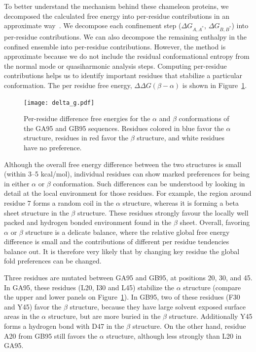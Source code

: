 \documentclass[12pt]{article}
\begin{document}
To better understand the mechanism behind these chameleon proteins, we decomposed the calculated free energy into
per-residue contributions in an approximate way~\cite{Tyka2006}. We decompose each confinement step ($\Delta
G_{A,A^\ast}$, $\Delta G_{B,B^\ast}$) into per-residue contributions. We can also decompose the remaining enthalpy in
the confined ensemble into per-residue contributions. However, the method is approximate because we do not include the
residual conformational entropy from the normal mode or quasiharmonic analysis steps. Computing per-residue
contributions helps us to identify important residues that stabilize a particular conformation. The per residue free
energy, $\Delta \Delta G (\beta - \alpha)$ is shown in Figure~\ref{fig:perresidue_orban}.

\begin{figure}
    \begin{center}
        \texttt{[image: delta\_g.pdf]}
    \end{center}
    \caption{Per-residue difference free energies for the $\alpha$ and $\beta$ conformations of the GA95 and GB95
        sequences. Residues colored in blue favor the $\alpha$ structure, residues in red favor the $\beta$ structure,
        and white residues have no preference.}
\label{fig:perresidue_orban}
\end{figure}

Although the overall free energy difference between the two structures is small (within 3--5 kcal/mol), individual
residues can show marked preferences for being in either $\alpha$ or $\beta$ conformation. Such differences can be
understood by looking in detail at the local environment for those residues. For example, the region around residue 7
forms a random coil in the $\alpha$ structure, whereas it is forming a beta sheet structure in the $\beta$ structure.
These residues strongly favour the locally well packed and hydrogen bonded environment found in the $\beta$ sheet.
Overall, favoring $\alpha$ or $\beta$ structure is a delicate balance, where the relative global free energy difference
is small and the contributions of different per residue tendencies balance out. It is therefore very likely that by
changing key residue the global fold preferences can be changed.

Three residues are mutated between GA95 and GB95, at positions 20, 30, and 45. In GA95, these residues (L20, I30 and
L45) stabilize the $\alpha$ structure (compare the upper and lower panels on Figure~\ref{fig:perresidue_orban}). In
GB95, two of these residues (F30 and Y45) favor the $\beta$ structure, because they have large solvent exposed surface
areas in the $\alpha$ structure, but are more buried in the $\beta$ structure. Additionally Y45 forms a hydrogen bond
with D47 in the $\beta$ structure. On the other hand, residue A20 from GB95 still favors the $\alpha$ structure,
although less strongly than L20 in GA95.
\end{document}
